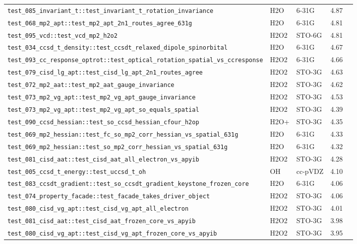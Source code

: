 \documentclass[10pt]{article}
\begin{document}
\begin{longtable}{l l l r c}
\texttt{test\_085\_invariant\_t::test\_invariant\_t\_rotation\_invariance} & H2O & 6-31G & 4.87 &  \\
\texttt{test\_068\_mp2\_apt::test\_mp2\_apt\_2n1\_routes\_agree\_631g} & H2O & 6-31G & 4.81 &  \\
\texttt{test\_095\_vcd::test\_vcd\_mp2\_h2o2} & H2O2 & STO-6G & 4.81 &  \\
\texttt{test\_034\_ccsd\_t\_density::test\_ccsdt\_relaxed\_dipole\_spinorbital} & H2O & 6-31G & 4.67 &  \\
\texttt{test\_093\_cc\_response\_optrot::test\_optical\_rotation\_spatial\_vs\_ccresponse} & H2O2 & 6-31G & 4.66 &  \\
\texttt{test\_079\_cisd\_lg\_apt::test\_cisd\_lg\_apt\_2n1\_routes\_agree} & H2O2 & STO-3G & 4.63 &  \\
\texttt{test\_072\_mp2\_aat::test\_mp2\_aat\_gauge\_invariance} & H2O2 & STO-3G & 4.62 &  \\
\texttt{test\_073\_mp2\_vg\_apt::test\_mp2\_vg\_apt\_gauge\_invariance} & H2O2 & STO-3G & 4.53 &  \\
\texttt{test\_073\_mp2\_vg\_apt::test\_mp2\_vg\_apt\_so\_equals\_spatial} & H2O2 & STO-3G & 4.39 &  \\
\texttt{test\_090\_ccsd\_hessian::test\_so\_ccsd\_hessian\_cfour\_h2op} & H2O+ & STO-3G & 4.35 &  \\
\texttt{test\_069\_mp2\_hessian::test\_fc\_so\_mp2\_corr\_hessian\_vs\_spatial\_631g} & H2O & 6-31G & 4.33 &  \\
\texttt{test\_069\_mp2\_hessian::test\_so\_mp2\_corr\_hessian\_vs\_spatial\_631g} & H2O & 6-31G & 4.32 &  \\
\texttt{test\_081\_cisd\_aat::test\_cisd\_aat\_all\_electron\_vs\_apyib} & H2O2 & STO-3G & 4.28 &  \\
\texttt{test\_005\_ccsd\_t\_energy::test\_uccsd\_t\_oh} & OH & cc-pVDZ & 4.10 &  \\
\texttt{test\_083\_ccsdt\_gradient::test\_so\_ccsdt\_gradient\_keystone\_frozen\_core} & H2O & 6-31G & 4.06 &  \\
\texttt{test\_074\_property\_facade::test\_facade\_takes\_driver\_object} & H2O2 & STO-3G & 4.06 &  \\
\texttt{test\_080\_cisd\_vg\_apt::test\_cisd\_vg\_apt\_all\_electron} & H2O2 & STO-3G & 4.01 &  \\
\texttt{test\_081\_cisd\_aat::test\_cisd\_aat\_frozen\_core\_vs\_apyib} & H2O2 & STO-3G & 3.98 &  \\
\texttt{test\_080\_cisd\_vg\_apt::test\_cisd\_vg\_apt\_frozen\_core\_vs\_apyib} & H2O2 & STO-3G & 3.95 &  \\

\end{longtable}
\end{document}
